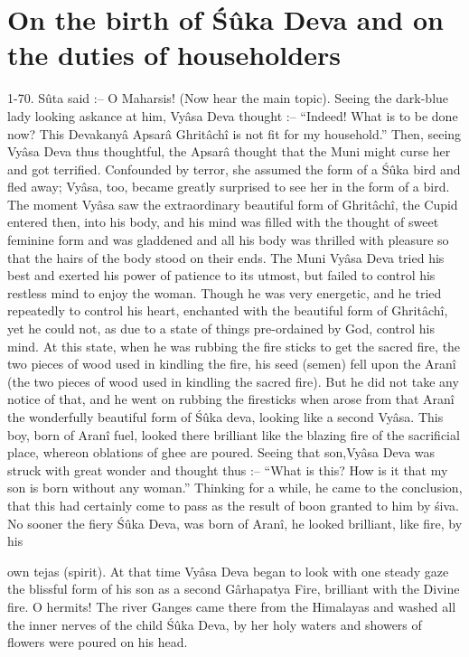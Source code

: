 \chapter{On the birth of \'S\^uka Deva and on the duties of householders}

1-70. S\^uta said :-- O Maharsis! (Now hear the main topic). Seeing the dark-blue lady looking askance at him, Vy\^asa Deva thought :-- ``Indeed! What is to be done now? This Devakany\^a Apsar\^a Ghrit\^ach\^i is not fit for my household.'' Then, seeing Vy\^asa Deva thus thoughtful, the Apsar\^a thought that the Muni might curse her and got terrified. Confounded by terror, she assumed the form of a \'S\^uka bird and fled away; Vy\^asa, too, became greatly surprised to see her in the form of a bird. The moment Vy\^asa saw the extraordinary beautiful form of Ghrit\^ach\^i, the Cupid entered then, into his body, and his mind was filled with the thought of sweet feminine form and was gladdened and all his body was thrilled with pleasure so that the hairs of the body stood on their ends. The Muni Vy\^asa Deva tried his best and exerted his power of patience to its utmost, but failed to control his restless mind to enjoy the woman. Though he was very energetic, and he tried repeatedly to control his heart, enchanted with the beautiful form of Ghrit\^ach\^i, yet he could not, as due to a state of things pre-ordained by God, control his mind. At this state, when he was rubbing the fire sticks to get the sacred fire, the two pieces of wood used in kindling the fire, his seed (semen) fell upon the Aran\^i (the two pieces of wood used in kindling the sacred fire). But he did not take any notice of that, and he went on rubbing the firesticks when arose from that Aran\^i the wonderfully beautiful form of \'S\^uka deva, looking like a second Vy\^asa. This boy, born of Aran\^i fuel, looked there brilliant like the blazing fire of the sacrificial place, whereon oblations of ghee are poured. Seeing that son,Vy\^asa Deva was struck with great wonder and thought thus :-- ``What is this? How is it that my son is born without any woman.'' Thinking for a while, he came to the conclusion, that this had certainly come to pass as the result of boon granted to him by \'siva. No sooner the fiery \'S\^uka Deva, was born of Aran\^i, he looked brilliant, like fire, by his

own tejas (spirit). At that time Vy\^asa Deva began to look with one steady gaze the blissful form of his son as a second G\^arhapatya Fire, brilliant with the Divine fire. O hermits! The river Ganges came there from the Himalayas and washed all the inner nerves of the child \'S\^uka Deva, by her holy waters and showers of flowers were poured on his head.

